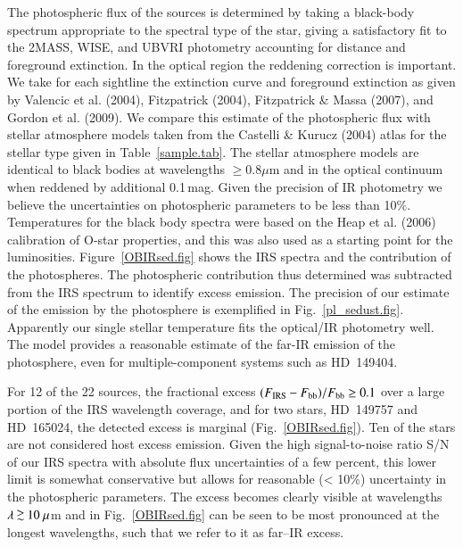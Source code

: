 \documentclass[tradiabstract]{aa} %
\newcommand{\simgreat} {\mathbin{\lower 3pt\hbox{$\rlap{\raise
        5pt\hbox{$\char'076$}}\mathchar"7218$}}}
\begin{document}
The photospheric flux of the sources is determined by taking a
black-body spectrum appropriate to the spectral type of the star,
giving a satisfactory fit to the 2MASS, WISE, and UBVRI photometry
accounting for distance and foreground extinction. { { In the
    optical region the reddening correction is important. We take for
    each sightline the extinction curve and foreground
    extinction as given by Valencic et al. (2004), Fitzpatrick (2004),
    Fitzpatrick \& Massa (2007), and Gordon et al. (2009). We compare
    this estimate of the photospheric flux with stellar atmosphere
    models taken from the Castelli \& Kurucz (2004) atlas for the
    stellar type given in Table~\ref{sample.tab}. The stellar
    atmosphere models are identical to black bodies at wavelengths $\geq
    0.8 \mu$m and in the optical continuum when reddened by additional
    0.1\,mag. }} Given the precision of IR photometry we believe the
uncertainties{ on} photospheric parameters to be less than
10\%. Temperatures for the black body spectra were based on the Heap
et al. (2006) calibration of O-star properties, and this was also used
as a starting point for the luminosities. Figure~\ref{OBIRsed.fig}
shows the IRS spectra and the contribution of the photospheres.  The
photospheric contribution thus determined was subtracted from the IRS
spectrum to identify excess emission. { {The precision of our
    estimate of the emission by the photosphere is exemplified in
    Fig.~\ref{pl_sedust.fig}.  Apparently our single stellar
    temperature fits the optical/IR photometry well. The model provides
    a reasonable estimate of the far-IR emission of the photosphere,
    even for multiple-component systems such as HD~149404.  }}


For 12 of the 22 sources, the fractional excess $(F_{\rm {IRS}} -
F_{\rm {bb}}) /F_{\rm {bb}} \ge 0.1$ over a large portion of the IRS
wavelength coverage, and for two stars, HD~149757 and HD~165024, the
detected excess is marginal (Fig.~\ref{OBIRsed.fig}). Ten of the stars
are{ not considered host excess emission}. Given the high
signal-to-noise ratio S/N of our IRS spectra with absolute flux
uncertainties of a few percent, this lower limit is somewhat
conservative but allows for reasonable (< 10\%) uncertainty in the
photospheric parameters. The excess becomes clearly visible at
wavelengths $\lambda \simgreat 10 \ \mu$m and in
Fig.~\ref{OBIRsed.fig} can be seen to be most pronounced at the
longest wavelengths, such that we refer to it as far--IR excess.
\end{document}
